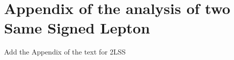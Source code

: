 \section{Appendix of the  analysis of two Same Signed Lepton }
\label{sec:AppTwoLSS}
Add the Appendix of the text for 2LSS


